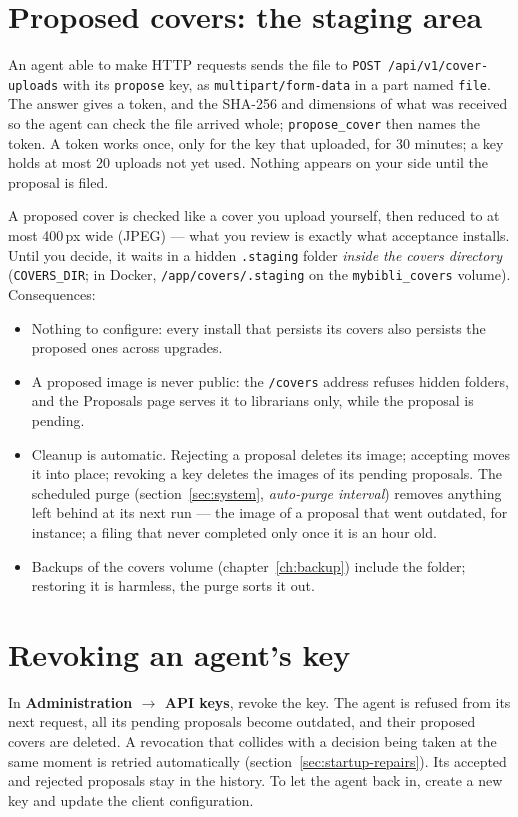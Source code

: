 \section{Proposed covers: the staging area}
\label{sec:agents-staging}

An agent able to make HTTP requests sends the file to
\texttt{POST /api/v1/cover-uploads} with its \texttt{propose} key, as
\texttt{multipart/form-data} in a part named \texttt{file}. The answer
gives a token, and the SHA-256 and dimensions of what was received so
the agent can check the file arrived whole; \texttt{propose\_cover} then
names the token. A token works once, only for the key that uploaded,
for 30 minutes; a key holds at most 20 uploads not yet used. Nothing
appears on your side until the proposal is filed.

A proposed cover is checked like a cover you upload yourself, then
reduced to at most 400\,px wide (JPEG) --- what you review is exactly
what acceptance installs. Until you decide, it waits in a hidden
\texttt{.staging} folder \emph{inside the
covers directory} (\texttt{COVERS\_DIR}; in Docker,
\texttt{/app/covers/.staging} on the \texttt{mybibli\_covers} volume).
Consequences:

\begin{itemize}
  \item Nothing to configure: every install that persists its covers
        also persists the proposed ones across upgrades.
  \item A proposed image is never public: the \texttt{/covers}
        address refuses hidden folders, and the Proposals page serves
        it to librarians only, while the proposal is pending.
  \item Cleanup is automatic. Rejecting a proposal deletes its image;
        accepting moves it into place; revoking a key deletes the
        images of its pending proposals. The scheduled purge
        (section~\ref{sec:system}, \emph{auto-purge interval}) removes
        anything left behind at its next run --- the image of a
        proposal that went outdated, for instance; a filing that never
        completed only once it is an hour old.
  \item Backups of the covers volume (chapter~\ref{ch:backup}) include
        the folder; restoring it is harmless, the purge sorts it out.
\end{itemize}

\section{Revoking an agent's key}
\label{sec:agents-revoke}

In \textbf{Administration \(\rightarrow\) API keys}, revoke the key.
The agent is refused from its next request, all its pending proposals
become outdated, and their proposed covers are deleted. A revocation
that collides with a decision being taken at the same moment is
retried automatically (section~\ref{sec:startup-repairs}). Its accepted
and rejected proposals stay in the history. To let the agent back in,
create a new key and update the client configuration.
